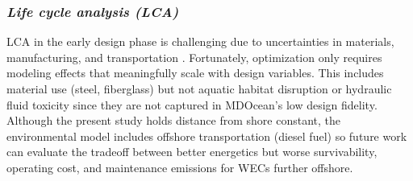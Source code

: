 \documentclass[10pt,twoside]{article}
\begin{document}

\subsubsection{\textit{Life cycle analysis (LCA)}}
LCA in the early design phase is challenging due to uncertainties in materials, manufacturing, and transportation \cite{moni_life_2020}.
Fortunately, optimization only requires modeling effects that meaningfully scale with design variables.
This includes material use (steel, fiberglass) but not aquatic habitat disruption or hydraulic fluid toxicity since they are not captured in MDOcean's low design fidelity.
Although the present study holds distance from shore constant, the environmental model includes offshore transportation (diesel fuel) so future work can evaluate the tradeoff between better energetics but worse survivability, operating cost, and maintenance emissions for WECs further offshore.
\end{document}
